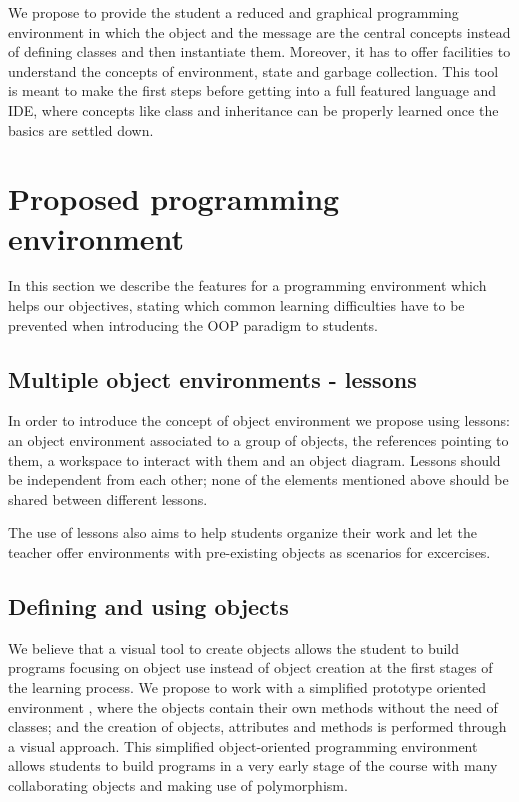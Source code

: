\documentclass{sigplanconf}
\begin{document}
We propose to provide the student a reduced and graphical programming environment in which the object and the message are the central concepts instead of defining classes and then instantiate them.  Moreover, it has to offer facilities to understand the concepts of environment, state and garbage collection.  This tool is meant to make the first steps before getting into a full featured language and IDE, where concepts like class and inheritance can be properly learned once the basics are settled down.

\section{Proposed programming environment}

In this section we describe the features for a programming environment which helps our objectives, 
stating which common learning difficulties have to be prevented when introducing the OOP paradigm to students. 

\subsection{Multiple object environments - lessons}

In order to introduce the concept of object environment we propose using lessons: an object environment associated to a group of objects, the references pointing to them, a workspace to interact with them and an object diagram. Lessons should be independent from each other; none of the elements mentioned above should be shared between different lessons.

The use of lessons also aims to help students organize their work and let the teacher offer environments with pre-existing objects as scenarios for excercises.

\subsection{Defining and using objects}
We believe that a visual tool to create objects allows the student to build programs focusing on object use instead of object creation at the first stages of the learning process. We propose to work with a simplified prototype oriented environment \cite{Wilk02,Mads96}, where the objects contain their own methods without the need of classes; and the creation of objects, attributes and methods is performed through a visual approach. This simplified object-oriented programming environment allows students to build programs in a very early stage of the course with many collaborating objects and making use of polymorphism.
\end{document}
